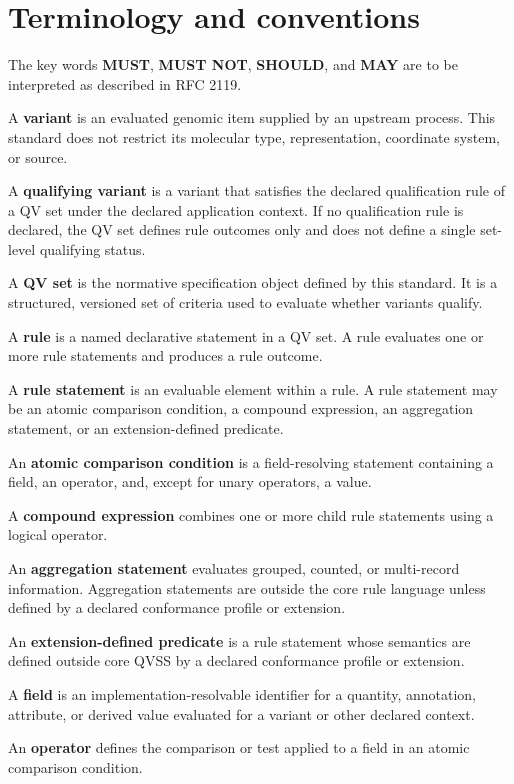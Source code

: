 \documentclass[11pt,a4paper]{article}
\begin{document}
\section{Terminology and conventions}

The key words \textbf{MUST}, \textbf{MUST NOT}, \textbf{SHOULD}, and \textbf{MAY} are to be interpreted as described in RFC 2119.

A \textbf{variant} is an evaluated genomic item supplied by an upstream process. This standard does not restrict its molecular type, representation, coordinate system, or source.

A \textbf{qualifying variant} is a variant that satisfies the declared qualification rule of a QV set under the declared application context. If no qualification rule is declared, the QV set defines rule outcomes only and does not define a single set-level qualifying status.

A \textbf{QV set} is the normative specification object defined by this standard. It is a structured, versioned set of criteria used to evaluate whether variants qualify.

A \textbf{rule} is a named declarative statement in a QV set. A rule evaluates one or more rule statements and produces a rule outcome.

A \textbf{rule statement} is an evaluable element within a rule. A rule statement may be an atomic comparison condition, a compound expression, an aggregation statement, or an extension-defined predicate.

An \textbf{atomic comparison condition} is a field-resolving statement containing a field, an operator, and, except for unary operators, a value.

A \textbf{compound expression} combines one or more child rule statements using a logical operator.

An \textbf{aggregation statement} evaluates grouped, counted, or multi-record information. Aggregation statements are outside the core rule language unless defined by a declared conformance profile or extension.

An \textbf{extension-defined predicate} is a rule statement whose semantics are defined outside core QVSS by a declared conformance profile or extension.

A \textbf{field} is an implementation-resolvable identifier for a quantity, annotation, attribute, or derived value evaluated for a variant or other declared context.

An \textbf{operator} defines the comparison or test applied to a field in an atomic comparison condition.
\end{document}
